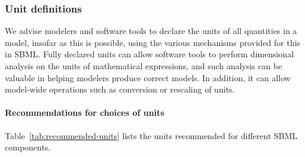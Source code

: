 \subsubsection{Unit definitions}
\label{sec:bp:unitdefinitions}

We advise modelers and software tools to declare the units of all
quantities in a model, insofar as this is possible, using the
various mechanisms provided for this in SBML.  Fully declared
units can allow software tools to perform dimensional analysis on
the units of mathematical expressions, and such analysis can be
valuable in helping modelers produce correct models.  In addition,
it can allow model-wide operations such as conversion or rescaling
of units.


\paragraph{Recommendations for choices of units}
\label{sec:bp:unitdefinitions:recommendedunits}

Table~\ref{tab:recommended-units} lists the units recommended for
different SBML components.

